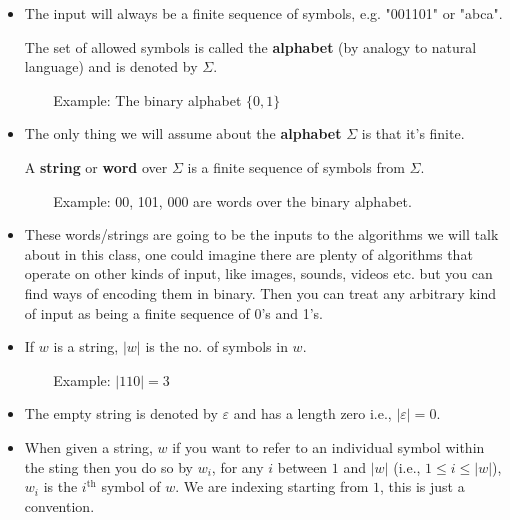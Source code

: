 \documentclass{article}
\begin{document}
\begin{itemize}
    \item The input will always be a finite sequence of symbols, e.g. "001101" or "abca".
    
    \begin{tcolorbox} [title= Definition:, colback=black!10!white]
        The set of allowed symbols is called the \textbf{alphabet} (by analogy to natural language) and is denoted by $\Sigma$.
    \end{tcolorbox}
    \begin{itemize}
        \item[$	$] Example: The binary alphabet $\{0,1\}$
    \end{itemize}
    \item The only thing we will assume about the \textbf{alphabet} $\Sigma$ is that it's finite.
    \begin{tcolorbox} [title= Definition:, colback=black!10!white]
        A \textbf{string} or \textbf{word} over $\Sigma$ is a finite sequence of symbols from $\Sigma$.
    \end{tcolorbox}
    \begin{itemize}
        \item[$ $] Example: 00, 101, 000 are words over the binary alphabet.
    \end{itemize}
    \item These words/strings are going to be the inputs to the algorithms we will talk about in this class, one could imagine there are plenty of algorithms that operate on other kinds of input, like images, sounds, videos etc. but you can find ways of encoding them in binary. Then you can treat any arbitrary kind of input as being a finite sequence of 0's and 1's.
    \item If $w$ is a string, $|w|$ is the no. of symbols in $w$.
    \begin{itemize}
        \item[$ $] Example: $|110|=3$
    \end{itemize}
    \item The empty string is denoted by $\varepsilon$ and has a length zero i.e., $|\varepsilon|=0$.
    \item When given a string, $w$ if you want to refer to an individual symbol within the sting then you do so by $w_i$, for any $i$ between $1$ and $|w|$ (i.e., $1\le i \le |w|$), $w_i$ is the $i^{\text{th}}$ symbol of $w$. We are indexing starting from $1$, this is just a convention.
    \begin{itemize}

\end{itemize}
\end{itemize}
\end{document}
